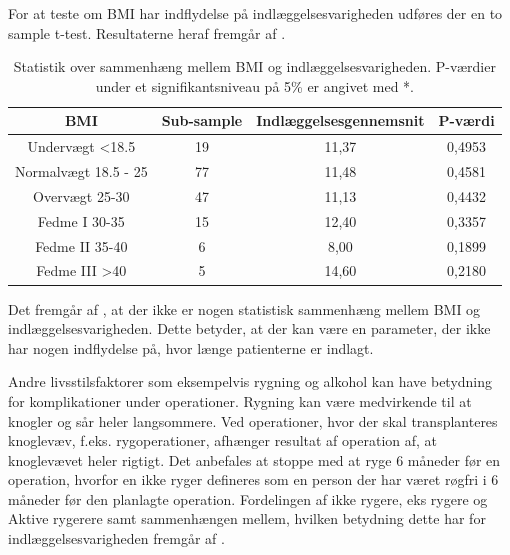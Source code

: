 For at teste om BMI har indflydelse på indlæggelsesvarigheden udføres der en to sample t-test. Resultaterne heraf fremgår af .

\begin{table}[H]
\centering
\begin{tabular}{|c|c|c|c|}
\hline
\textbf{BMI}         & \textbf{Sub-sample} & \textbf{Indlæggelsesgennemsnit} & \textbf{P-værdi} \\ \hline
Undervægt \textless18.5  & 19                  & 11,37                           & 0,4953           \\ \hline
Normalvægt 18.5 - 25     & 77                  & 11,48                           & 0,4581           \\ \hline
Overvægt 25-30           & 47                  & 11,13                           & 0,4432           \\ \hline
Fedme I 30-35            & 15                  & 12,40                           & 0,3357           \\ \hline
Fedme II 35-40           & 6                   & 8,00                            & 0,1899           \\ \hline
Fedme III \textgreater40 & 5                   & 14,60                           & 0,2180           \\ \hline
\end{tabular}
\caption{Statistik over sammenhæng mellem BMI og indlæggelsesvarigheden. P-værdier under et signifikantsniveau på 5\% er angivet med *.}
\label{BMIindlaegtab}
\end{table}

\noindent
Det fremgår af , at der ikke er nogen statistisk sammenhæng mellem BMI og indlæggelsesvarigheden. Dette betyder, at der kan være en parameter, der ikke har nogen indflydelse på, hvor længe patienterne er indlagt.

Andre livsstilsfaktorer som eksempelvis rygning og alkohol kan have betydning for komplikationer under operationer. Rygning kan være medvirkende til at knogler og sår heler langsommere. Ved operationer, hvor der skal transplanteres knoglevæv, f.eks. rygoperationer, afhænger resultat af operation af, at knoglevævet heler rigtigt. Det anbefales at stoppe med at ryge 6 måneder før en operation, hvorfor en ikke ryger defineres som en person der har været røgfri i 6 måneder før den planlagte operation.\cite{Nordjylland2014} Fordelingen af ikke rygere, eks rygere og Aktive rygerere samt sammenhængen mellem, hvilken betydning dette har for indlæggelsesvarigheden fremgår af .


